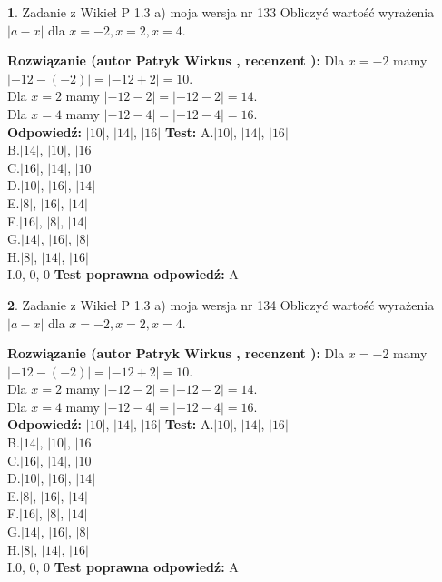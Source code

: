\documentclass[12pt, a4paper]{article}
\theoremstyle{definition} %
\newtheorem{zad}{}
\newcommand{\zadStart}[1]{\begin{zad}#1\newline}
\newcommand{\zadStop}{\end{zad}}
\newcommand{\rozwStart}[2]{\noindent \textbf{Rozwiązanie (autor #1 , recenzent #2): }\newline}
\newcommand{\rozwStop}{\newline}
\newcommand{\odpStart}{\noindent \textbf{Odpowiedź:}\newline}
\newcommand{\odpStop}{\newline}
\newcommand{\testStart}{\noindent \textbf{Test:}\newline}
\newcommand{\testStop}{\newline}
\newcommand{\kluczStart}{\noindent \textbf{Test poprawna odpowiedź:}\newline}
\newcommand{\kluczStop}{\newline}
\begin{document}
\zadStart{Zadanie z Wikieł P 1.3 a) moja wersja nr 133}
Obliczyć wartość wyrażenia $|a - x|$ dla $x=-2,x=2,x=4$.
\zadStop
\rozwStart{Patryk Wirkus}{}
Dla $x = -2$ mamy $|-12 - (-2)| = |-12 + 2| = 10$.\\
Dla $x = 2$ mamy $|-12 - 2| = |-12 - 2| = 14$.\\
Dla $x = 4$ mamy $|-12 - 4| = |-12 - 4| = 16$.\\
\rozwStop
\odpStart
$|10|$, $|14|$, $|16|$
\odpStop
\testStart
A.$|10|$, $|14|$, $|16|$\\
B.$|14|$, $|10|$, $|16|$\\
C.$|16|$, $|14|$, $|10|$\\
D.$|10|$, $|16|$, $|14|$\\
E.$|8|$, $|16|$, $|14|$\\
F.$|16|$, $|8|$, $|14|$\\
G.$|14|$, $|16|$, $|8|$\\
H.$|8|$, $|14|$, $|16|$\\
I.$0$, $0$, $0$
\testStop
\kluczStart
A
\kluczStop



\zadStart{Zadanie z Wikieł P 1.3 a) moja wersja nr 134}
Obliczyć wartość wyrażenia $|a - x|$ dla $x=-2,x=2,x=4$.
\zadStop
\rozwStart{Patryk Wirkus}{}
Dla $x = -2$ mamy $|-12 - (-2)| = |-12 + 2| = 10$.\\
Dla $x = 2$ mamy $|-12 - 2| = |-12 - 2| = 14$.\\
Dla $x = 4$ mamy $|-12 - 4| = |-12 - 4| = 16$.\\
\rozwStop
\odpStart
$|10|$, $|14|$, $|16|$
\odpStop
\testStart
A.$|10|$, $|14|$, $|16|$\\
B.$|14|$, $|10|$, $|16|$\\
C.$|16|$, $|14|$, $|10|$\\
D.$|10|$, $|16|$, $|14|$\\
E.$|8|$, $|16|$, $|14|$\\
F.$|16|$, $|8|$, $|14|$\\
G.$|14|$, $|16|$, $|8|$\\
H.$|8|$, $|14|$, $|16|$\\
I.$0$, $0$, $0$
\testStop
\kluczStart
A
\kluczStop
\end{document}
